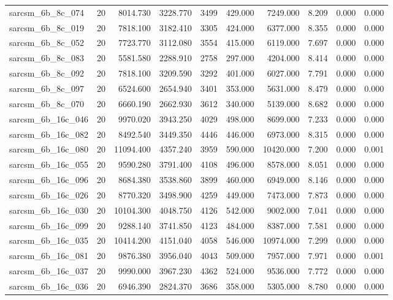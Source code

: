 \begin{tabular}{lrrrrrrrrr}
sarcsm\_6b\_8c\_074 & 20 & 8014.730 & 3228.770 & 3499 & 429.000 & 7249.000 & 8.209 & 0.000 & 0.000 \\
sarcsm\_6b\_8c\_019 & 20 & 7818.100 & 3182.410 & 3305 & 424.000 & 6377.000 & 8.355 & 0.000 & 0.000 \\
sarcsm\_6b\_8c\_052 & 20 & 7723.770 & 3112.080 & 3554 & 415.000 & 6119.000 & 7.697 & 0.000 & 0.000 \\
sarcsm\_6b\_8c\_083 & 20 & 5581.580 & 2288.910 & 2758 & 297.000 & 4204.000 & 8.414 & 0.000 & 0.000 \\
sarcsm\_6b\_8c\_092 & 20 & 7818.100 & 3209.590 & 3292 & 401.000 & 6027.000 & 7.791 & 0.000 & 0.000 \\
sarcsm\_6b\_8c\_097 & 20 & 6524.600 & 2654.940 & 3401 & 353.000 & 5631.000 & 8.479 & 0.000 & 0.000 \\
sarcsm\_6b\_8c\_070 & 20 & 6660.190 & 2662.930 & 3612 & 340.000 & 5139.000 & 8.682 & 0.000 & 0.000 \\
sarcsm\_6b\_16c\_046 & 20 & 9970.020 & 3943.250 & 4029 & 498.000 & 8699.000 & 7.233 & 0.000 & 0.000 \\
sarcsm\_6b\_16c\_082 & 20 & 8492.540 & 3449.350 & 4446 & 446.000 & 6973.000 & 8.315 & 0.000 & 0.000 \\
sarcsm\_6b\_16c\_080 & 20 & 11094.400 & 4357.240 & 3959 & 590.000 & 10420.000 & 7.200 & 0.000 & 0.001 \\
sarcsm\_6b\_16c\_055 & 20 & 9590.280 & 3791.400 & 4108 & 496.000 & 8578.000 & 8.051 & 0.000 & 0.000 \\
sarcsm\_6b\_16c\_096 & 20 & 8684.380 & 3538.860 & 3899 & 460.000 & 6949.000 & 8.146 & 0.000 & 0.000 \\
sarcsm\_6b\_16c\_026 & 20 & 8770.320 & 3498.900 & 4259 & 449.000 & 7473.000 & 7.873 & 0.000 & 0.000 \\
sarcsm\_6b\_16c\_030 & 20 & 10104.300 & 4048.750 & 4126 & 542.000 & 9002.000 & 7.041 & 0.000 & 0.000 \\
sarcsm\_6b\_16c\_099 & 20 & 9288.140 & 3741.850 & 4123 & 484.000 & 8387.000 & 7.581 & 0.000 & 0.000 \\
sarcsm\_6b\_16c\_035 & 20 & 10414.200 & 4151.040 & 4058 & 546.000 & 10974.000 & 7.299 & 0.000 & 0.000 \\
sarcsm\_6b\_16c\_081 & 20 & 9876.380 & 3956.040 & 4043 & 509.000 & 7957.000 & 7.971 & 0.000 & 0.001 \\
sarcsm\_6b\_16c\_037 & 20 & 9990.000 & 3967.230 & 4362 & 524.000 & 9536.000 & 7.772 & 0.000 & 0.000 \\
sarcsm\_6b\_16c\_036 & 20 & 6946.390 & 2824.370 & 3686 & 358.000 & 5305.000 & 8.780 & 0.000 & 0.000 \\

\end{tabular}
